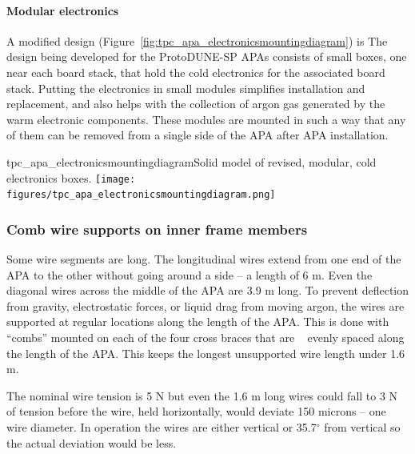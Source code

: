 \paragraph{Modular electronics}


 A modified design (Figure~\ref{fig:tpc_apa_electronicsmountingdiagram}) is 
The design being developed for the ProtoDUNE-SP APAs consists of small boxes, one near each board stack, that hold the cold electronics for the associated board stack.  Putting the electronics in small modules simplifies installation and replacement, and also helps with the collection of argon gas generated by the warm electronic components.  These modules are mounted in such a way that any of them can be removed from a single side of the APA after APA installation.

\begin{cdrfigure}{tpc_apa_electronicsmountingdiagram}{Solid model of revised, modular, cold electronics boxes.}
\texttt{[image: figures/tpc\_apa\_electronicsmountingdiagram.png]} 
\end{cdrfigure}

\subsubsection{Comb wire supports on inner frame members}
\label{subsec:apa_combs}


Some wire segments are long.  The longitudinal wires extend from one end of the APA to the other without going around a side -- a length of 6 m.  Even the diagonal wires across the middle of the APA are 3.9 m long.  To prevent deflection from gravity, electrostatic forces, or liquid drag from moving argon, the wires are supported at regular locations along the length of the APA.  This is done with ``combs'' mounted on each of the four cross braces that are ~ evenly spaced along the length of the APA.  This keeps the longest unsupported wire length under 1.6 m.

The nominal wire tension is 5 N but even the 1.6 m long wires could fall to 3 N of tension before the wire, held horizontally, would deviate 150 microns -- one wire diameter.  In operation the wires are either vertical or 35.7$^{\circ}$ from vertical so the actual deviation would be less.

